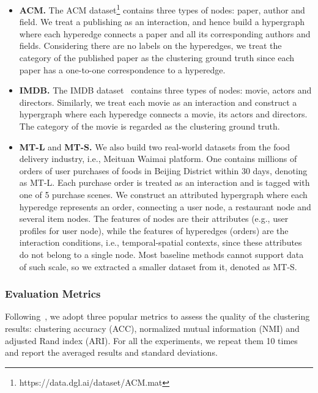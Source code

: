 \documentclass[11pt]{article}
\begin{document}
\begin{itemize} %
	\item \textbf{ACM. }
	The ACM dataset\footnote{https://data.dgl.ai/dataset/ACM.mat} contains three types of nodes: paper, author and field. We treat a publishing as an interaction, and hence build a hypergraph where each hyperedge connects a paper and all its corresponding authors and fields. Considering there are no labels on the hyperedges, we treat the category of the published paper as the clustering ground truth since each paper has a one-to-one correspondence to a hyperedge.
	
	\item \textbf{IMDB. }
	The IMDB dataset~\cite{yun_graph_2019} contains three types of nodes: movie, actors and directors. Similarly, we treat each movie as an interaction and construct a hypergraph where each hyperedge connects a movie, its actors and directors. The category of the movie is regarded as the clustering ground truth.
	
	\item \textbf{MT-L} and \textbf{MT-S. }
	We also build two real-world datasets from the food delivery industry, i.e., Meituan Waimai platform. %
	One contains millions of orders of user purchases of foods in Beijing District within 30 days, denoting as MT-L. Each purchase order is treated as an interaction and is tagged with one of 5 purchase scenes. We construct an attributed hypergraph where each hyperedge represents an order, connecting a user node, a restaurant node and several item nodes. The features of nodes are their attributes (e.g., user profiles for user node), while the features of hyperedges (orders) are the interaction conditions, i.e., temporal-spatial contexts, since these attributes do not belong to a single node.
	Most baseline methods cannot support data of such scale, so we extracted a smaller dataset from it, denoted as MT-S.
\end{itemize}

\subsubsection{Evaluation Metrics}
Following~\cite{hu_adaptive_2021}, we adopt three popular metrics to assess the quality of the clustering results: clustering accuracy (ACC), normalized mutual information (NMI) and adjusted Rand index (ARI). For all the experiments, we repeat them 10 times and report the averaged results and standard deviations.
\end{document}
